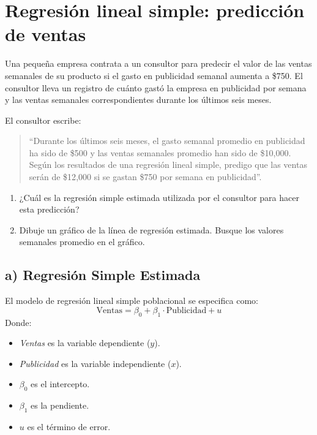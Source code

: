 \documentclass[12pt]{article}
\begin{document}
%

\section{Regresión lineal simple: predicción de ventas}

Una pequeña empresa contrata a un consultor para predecir el valor de las ventas semanales de su producto si el gasto en publicidad semanal aumenta a \$750. 
El consultor lleva un registro de cuánto gastó la empresa en publicidad por semana y las ventas semanales correspondientes durante los últimos seis meses. 

El consultor escribe: 
\begin{quote}
``Durante los últimos seis meses, el gasto semanal promedio en publicidad ha sido de \$500 y las ventas semanales promedio han sido de \$10{,}000. 
Según los resultados de una regresión lineal simple, predigo que las ventas serán de \$12{,}000 si se gastan \$750 por semana en publicidad''.
\end{quote}

\begin{enumerate}[label=\alph*)]
    \item ¿Cuál es la regresión simple estimada utilizada por el consultor para hacer esta predicción?
    \item Dibuje un gráfico de la línea de regresión estimada. 
    Busque los valores semanales promedio en el gráfico.
\end{enumerate}

\subsection*{a) Regresión Simple Estimada}

El modelo de regresión lineal simple poblacional se especifica como:
$$
\text{Ventas} = \beta_0 + \beta_1 \cdot \text{Publicidad} + u
$$
Donde:
\begin{itemize}
    \item \textit{Ventas} es la variable dependiente ($y$).
    \item \textit{Publicidad} es la variable independiente ($x$).
    \item $\beta_0$ es el intercepto.
    \item $\beta_1$ es la pendiente.
    \item $u$ es el término de error.
\end{itemize}
\end{document}
